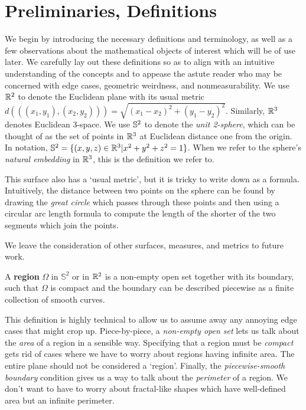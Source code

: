 \section{Preliminaries, Definitions}\label{sec:prelims}

We begin by introducing the necessary definitions and terminology, as
well as a few observations about the mathematical objects of interest
which will be of use later.  We carefully lay out these definitions so
as to align with an intuitive understanding of the concepts and to
appease the astute reader who may be concerned with edge cases,
geometric weirdness, and nonmeasurability.  We use $\mathbb{R}^2$ to denote the 
Euclidean plane with its usual metric $d(((x_1,y_1),(x_2,y_2))) = \sqrt{(x_1-x_2)^2 + (y_1-y_2)^2}$. 
Similarly, $\mathbb{R}^3$ denotes Euclidean 3-space.  We use $\mathbb{S}^2$ to denote the \textit{unit 2-sphere}, which can be 
thought of as the set of points in $\mathbb{R}^3$ at Euclidean distance one from the origin.  In notation, $\mathbb{S}^2=\{ (x,y,z)\in \mathbb{R}^3\vert  x^2+y^2+z^2=1\}$.  When we refer to the sphere's \textit{natural embedding} in  $\mathbb{R}^3$, this is the definition we refer to.

This surface also has a `usual metric', but it is tricky to write down as a formula.   Intuitively, the distance between two points on the sphere can be found by drawing the \textit{great circle} which passes through these points and then using a circular arc length formula to compute the length of the shorter of the two segments which join the points. 


We leave the consideration of
other surfaces, measures, and metrics to future work.


\begin{definition}
  A \textbf{region} $\Omega$ in $\mathbb{S}^2$ or 
  in $\mathbb{R}^2$ is a non-empty open set together with its
  boundary, such that $\Omega$ is compact and the boundary can be described piecewise as 
  a finite collection of smooth curves.
\end{definition}

This definition is highly technical to allow us to assume away any annoying edge 
cases that might crop up.  Piece-by-piece, a \textit{non-empty open set} lets us 
talk about the \textit{area} of a region in a sensible way. Specifying that a region 
must be \textit{compact} gets rid of cases where we have to worry about regions having 
infinite area.  The entire plane should not be considered a `region'.  Finally, the 
\textit{piecewise-smooth boundary} condition gives us a way to talk about the \textit{perimeter} 
of a region.  We don't want to have to worry about fractal-like shapes which have well-defined 
area but an infinite perimeter.


